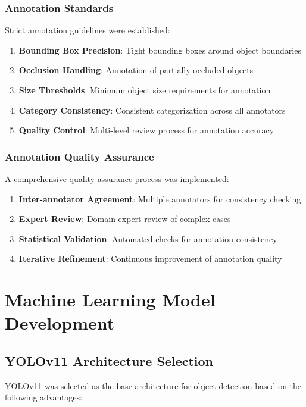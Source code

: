 \subsubsection{Annotation Standards}

Strict annotation guidelines were established:
\begin{enumerate}
    \item \textbf{Bounding Box Precision}: Tight bounding boxes around object boundaries
    \item \textbf{Occlusion Handling}: Annotation of partially occluded objects
    \item \textbf{Size Thresholds}: Minimum object size requirements for annotation
    \item \textbf{Category Consistency}: Consistent categorization across all annotators
    \item \textbf{Quality Control}: Multi-level review process for annotation accuracy
\end{enumerate}

\subsubsection{Annotation Quality Assurance}

A comprehensive quality assurance process was implemented:
\begin{enumerate}
    \item \textbf{Inter-annotator Agreement}: Multiple annotators for consistency checking
    \item \textbf{Expert Review}: Domain expert review of complex cases
    \item \textbf{Statistical Validation}: Automated checks for annotation consistency
    \item \textbf{Iterative Refinement}: Continuous improvement of annotation quality
\end{enumerate}

\section{Machine Learning Model Development}

\subsection{YOLOv11 Architecture Selection}

YOLOv11 was selected as the base architecture for object detection based on the following advantages:

